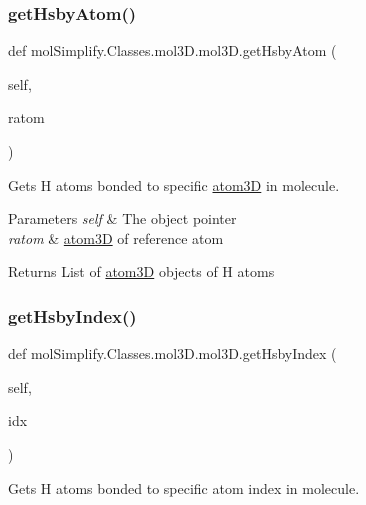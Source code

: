 \subsubsection{\texorpdfstring{get\+Hsby\+Atom()}{getHsbyAtom()}}
{\footnotesize\ttfamily def mol\+Simplify.\+Classes.\+mol3\+D.\+mol3\+D.\+get\+Hsby\+Atom (\begin{DoxyParamCaption}\item[{}]{self,  }\item[{}]{ratom }\end{DoxyParamCaption})}



Gets H atoms bonded to specific \hyperlink{namespacemolSimplify_1_1Classes_1_1atom3D}{atom3D} in molecule. 


\begin{DoxyParams}{Parameters}
{\em self} & The object pointer \\
\hline
{\em ratom} & \hyperlink{namespacemolSimplify_1_1Classes_1_1atom3D}{atom3D} of reference atom \\
\hline
\end{DoxyParams}
\begin{DoxyReturn}{Returns}
List of \hyperlink{namespacemolSimplify_1_1Classes_1_1atom3D}{atom3D} objects of H atoms 
\end{DoxyReturn}
\mbox{\label{classmolSimplify_1_1Classes_1_1mol3D_1_1mol3D_a99730d5cf790e512a55fbe0d1fd863c7}} 
\subsubsection{\texorpdfstring{get\+Hsby\+Index()}{getHsbyIndex()}}
{\footnotesize\ttfamily def mol\+Simplify.\+Classes.\+mol3\+D.\+mol3\+D.\+get\+Hsby\+Index (\begin{DoxyParamCaption}\item[{}]{self,  }\item[{}]{idx }\end{DoxyParamCaption})}



Gets H atoms bonded to specific atom index in molecule. 


